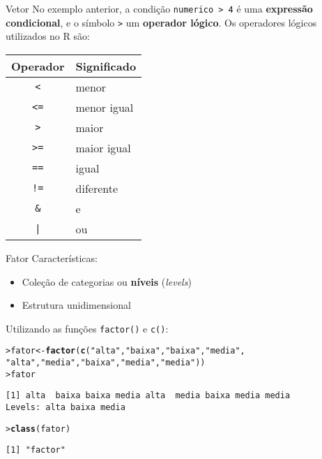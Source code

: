 \documentclass[10pt,handout]{beamer}\usepackage{graphicx, color}
\makeatletter
\newcommand{\hlfunctioncall}[1]{\textcolor[rgb]{0,0,0.545098039215686}{\textbf{#1}}}%
\newcommand{\hlstring}[1]{\textcolor[rgb]{0.282352941176471,0.23921568627451,0.545098039215686}{#1}}%
\newenvironment{kframe}{%
 \def\at@end@of@kframe{}%
 \ifinner\ifhmode%
  \def\at@end@of@kframe{\end{minipage}}%
  \begin{minipage}{\columnwidth}%
 \fi\fi%
 \def\FrameCommand##1{\hskip\@totalleftmargin \hskip-\fboxsep
 \colorbox{shadecolor}{##1}\hskip-\fboxsep
     \hskip-\linewidth \hskip-\@totalleftmargin \hskip\columnwidth}%
 \MakeFramed {\advance\hsize-\width
   \@totalleftmargin\z@ \linewidth\hsize
   \@setminipage}}%
 {\par\unskip\endMakeFramed%
 \at@end@of@kframe}
\newenvironment{knitrout}{}{} %
\makeatother
\begin{document}
\begin{frame}[fragile=singleslide]{Vetor}
No exemplo anterior, a condição \texttt{numerico > 4} é uma
\textbf{expressão condicional}, e o símbolo \texttt{>} um
\textbf{operador lógico}. Os operadores lógicos utilizados no R são:

\begin{table}[!ht]
    \centering
        \begin{tabular}{cl}
        \hline
        \multicolumn{0}{c}{Operador} & \multicolumn{1}{c}{Significado} \\
        \hline
        \verb|<| & menor \\
        \verb|<=| & menor igual \\
        \verb|>| & maior \\
        \verb|>=| & maior igual \\
        \verb|==| & igual \\
        \verb|!=| & diferente \\
        \verb|&| & e \\
        \verb+|+ & ou \\
        \hline
        \end{tabular}
\end{table}
\end{frame}

\begin{frame}[fragile=singleslide]{Fator}
Características:
\begin{itemize}
\item Coleção de categorias ou \textbf{níveis} (\emph{levels})
\item Estrutura unidimensional
\end{itemize}
Utilizando as funções \texttt{factor()} e \texttt{c()}:
\begin{knitrout}\small
{}\color{fgcolor}\begin{kframe}
\begin{alltt}
> fator <- \hlfunctioncall{factor}(\hlfunctioncall{c}(\hlstring{"alta"},\hlstring{"baixa"},\hlstring{"baixa"},\hlstring{"media"},
                    \hlstring{"alta"},\hlstring{"media"},\hlstring{"baixa"},\hlstring{"media"},\hlstring{"media"}))
> fator
\end{alltt}
\begin{verbatim}
[1] alta  baixa baixa media alta  media baixa media media
Levels: alta baixa media
\end{verbatim}
\begin{alltt}
> \hlfunctioncall{class}(fator)
\end{alltt}
\begin{verbatim}
[1] "factor"
\end{verbatim}
\end{kframe}
\end{knitrout}

\end{frame}
\end{document}
